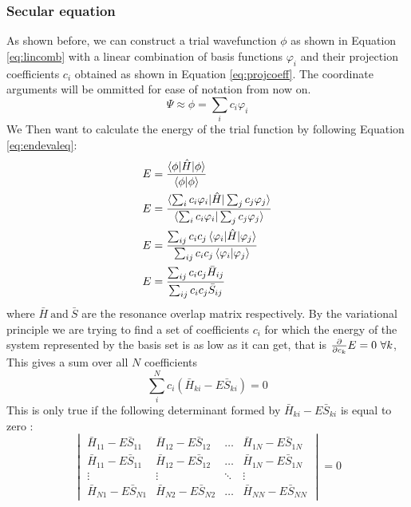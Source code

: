 \documentclass[../master_thesis.tex]{subfiles}
\begin{document}
\subsubsection{Secular equation}

As shown before, we can construct a trial wavefunction $\phi$ as shown in Equation
\ref{eq:lincomb} with a linear combination of basis functions $\varphi_i$ and
their projection coefficients $c_i$ obtained as shown in Equation \ref{eq:projcoeff}.
The coordinate arguments will be ommitted for ease of notation from now on.
\begin{equation}
  \Psi \approx \phi = \sum_i c_i \varphi_i
\end{equation}
 We Then want to calculate the energy of the trial function by following Equation
 \ref{eq:endevaleq}\cite{Cramer:2004}:
 \begin{align}
   \begin{split}
     E &= \frac{\braket{\phi|\hat{H}|\phi}}{\braket{\phi|\phi}} \\
     E &= \frac{\braket{\sum_i c_i \varphi_i|\hat{H}|\sum_j c_j \varphi_j}}{\braket{\sum_i c_i \varphi_i|\sum_j c_j \varphi_j}} \\
     E &= \frac{\sum_{ij} c_i c_j \braket{\varphi_i|\hat{H}|\varphi_j}}{\sum_{ij}c_i c_j\braket{\varphi_i|\varphi_j}}\\
     E &= \frac{\sum_{ij} c_i c_j\bar{H}_{ij}}{\sum_{ij} c_i c_j\bar{S}_{ij}}
   \end{split}
 \end{align}
where $\bar{H}\ \text{and} \ \bar{S}$ are the resonance overlap matrix respectively.
By the variational principle we are trying to find a set of coefficients $c_i$
for which the energy of the system represented by the basis set is as low as it
can get, that is $\diff{c_k}E = 0 \ \forall k $, This gives a sum over all $N$
coefficients \cite{Cramer:2004}
\begin{equation}\label{eq:linearci}
  \sum_{i}^N c_i (\bar{H}_{ki} - E\bar{S}_{ki}) = 0
\end{equation}
This is only true if the following determinant formed by $\bar{H}_{ki} - E\bar{S}_{ki}$
is equal to zero \cite{Cramer:2004}:
\begin{equation}\label{eq:seceq}
  \begin{vmatrix}
    \bar{H}_{11} - E\bar{S}_{11} & \bar{H}_{12} - E\bar{S}_{12} & \ldots & \bar{H}_{1N} - E\bar{S}_{1N} \\
    \bar{H}_{11} - E\bar{S}_{11} & \bar{H}_{12} - E\bar{S}_{12} & \ldots & \bar{H}_{1N} - E\bar{S}_{1N} \\
    \vdots & \vdots & \ddots & \vdots\\
    \bar{H}_{N1} - E\bar{S}_{N1} & \bar{H}_{N2} - E\bar{S}_{N2} & \ldots & \bar{H}_{NN} - E\bar{S}_{NN}
  \end{vmatrix} = 0
\end{equation}
\end{document}
